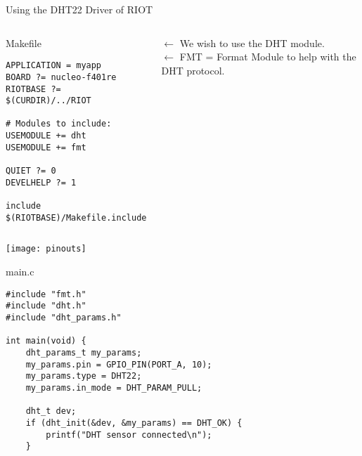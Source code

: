 \documentclass[aspectratio=169]{beamer}
\begin{document}
\begin{frame}[fragile]{Using the DHT22 Driver of RIOT}

\begin{columns}

\begin{exampleblock}{Makefile}
\begin{verbatim}
APPLICATION = myapp
BOARD ?= nucleo-f401re
RIOTBASE ?= $(CURDIR)/../RIOT

# Modules to include:
USEMODULE += dht
USEMODULE += fmt	

QUIET ?= 0
DEVELHELP ?= 1

include $(RIOTBASE)/Makefile.include
\end{verbatim}
\end{exampleblock}


\vspace{1.45cm}

$\leftarrow$ We wish to use the \alert{DHT module}.\\
$\leftarrow$ \alert{FMT} = Format Module to help with the DHT protocol.

\end{columns}
\vspace{.5cm}
\end{frame}



\begin{frame}{}
\vspace{.2cm}
\hspace*{1cm}
\texttt{[image: pinouts]}
\end{frame}


\begin{frame}[fragile]{}

\begin{exampleblock}{main.c}
\begin{verbatim}
#include "fmt.h"
#include "dht.h"
#include "dht_params.h"

int main(void) {
    dht_params_t my_params;
    my_params.pin = GPIO_PIN(PORT_A, 10);
    my_params.type = DHT22;
    my_params.in_mode = DHT_PARAM_PULL;

    dht_t dev;
    if (dht_init(&dev, &my_params) == DHT_OK) {
        printf("DHT sensor connected\n");
    }

\end{verbatim}
\end{exampleblock}

\vspace{5cm}
\end{frame}
\end{document}
